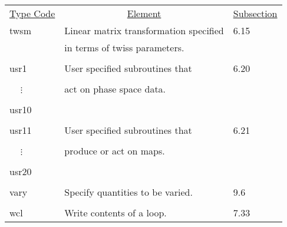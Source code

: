 \begin{center}
\newpage
\begin{tabular}{lll}
\multicolumn{1}{c}{\underline{Type Code}} &
\multicolumn{1}{c}{\underline{Element}}   &
\multicolumn{1}{c}{\underline{Subsection}} \\
\hspace{1.5em}twsm  &  Linear matrix transformation specified & \hspace{2em}6.15\\
               &         in terms of twiss parameters.        &      \\
\vspace{-3mm}& &\\
\hspace{1.5em}usr1    &  User specified subroutines that   &  \hspace{2em}6.20\\
\vspace{-7mm}& &\\
\hspace{1.5em}\ \ \,$\vdots$ &  act on phase space data.             &      \\
\vspace{-7mm}& &\\
\hspace{1.5em}usr10    &                                      &      \\
\vspace{-3mm}& &\\
\hspace{1.5em}usr11    &  User specified subroutines that   &  \hspace{2em}6.21\\
\vspace{-7mm}& &\\
\hspace{1.5em}\ \ \,$\vdots$ &   produce or act on maps.              &      \\
\vspace{-7mm}& &\\
\hspace{1.5em}usr20    & &\\
\vspace{-3mm}& &\\
\hspace{1.5em}vary   &  Specify quantities to be varied.     &  \hspace{2em}9.6\\
\vspace{-3mm}& &\\
\hspace{1.5em}wcl   &   Write contents of a loop.       & \hspace{2em}7.33\\

\end{tabular}
\end{center}
